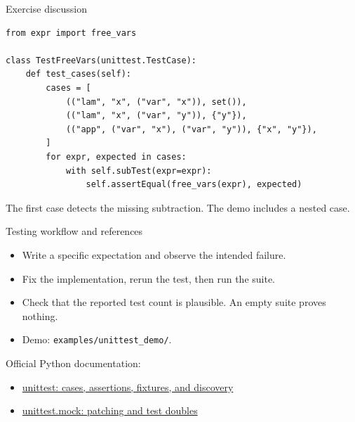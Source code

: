 \documentclass[aspectratio=169,11pt]{beamer}
\newcommand{\code}[1]{\texttt{#1}}
\begin{document}
\begin{frame}[fragile]{Exercise discussion}
\begin{lstlisting}
from expr import free_vars

class TestFreeVars(unittest.TestCase):
    def test_cases(self):
        cases = [
            (("lam", "x", ("var", "x")), set()),
            (("lam", "x", ("var", "y")), {"y"}),
            (("app", ("var", "x"), ("var", "y")), {"x", "y"}),
        ]
        for expr, expected in cases:
            with self.subTest(expr=expr):
                self.assertEqual(free_vars(expr), expected)
\end{lstlisting}
The first case detects the missing subtraction. The demo includes a nested case.
\end{frame}

\begin{frame}[fragile]{Testing workflow and references}
\begin{itemize}
\item Write a specific expectation and observe the intended failure.
\item Fix the implementation, rerun the test, then run the suite.
\item Check that the reported test count is plausible. An empty suite proves nothing.
\item Demo: \code{examples/unittest\_demo/}.
\end{itemize}
\medskip
Official Python documentation:
\begin{itemize}
\item \href{https://docs.python.org/3/library/unittest.html}{unittest: cases, assertions, fixtures, and discovery}
\item \href{https://docs.python.org/3/library/unittest.mock.html}{unittest.mock: patching and test doubles}
\end{itemize}
\end{frame}
\end{document}
